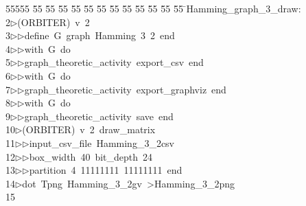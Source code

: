 %
%
\begin{tabbing}
55555 \= 55 \= 55 \= 55 \= 55 \= 55 \= 55 \= 55 \= 55 \= 55 \= 55 \= 55 \= 55 \= \>Hamming\_graph\_3\_draw:\\[0pt]
2\>$\triangleright$\>(ORBITER)\ v\ 2\ \\[0pt]
3\>$\triangleright$\>$\triangleright$\>define\ G\ graph\ Hamming\ 3\ 2\ end\ \\[0pt]
4\>$\triangleright$\>$\triangleright$\>with\ G\ do\ \\[0pt]
5\>$\triangleright$\>$\triangleright$\>graph\_theoretic\_activity\ export\_csv\ end\ \\[0pt]
6\>$\triangleright$\>$\triangleright$\>with\ G\ do\ \\[0pt]
7\>$\triangleright$\>$\triangleright$\>graph\_theoretic\_activity\ export\_graphviz\ end\ \\[0pt]
8\>$\triangleright$\>$\triangleright$\>with\ G\ do\ \\[0pt]
9\>$\triangleright$\>$\triangleright$\>graph\_theoretic\_activity\ save\ end\\[0pt]
10\>$\triangleright$\>(ORBITER)\ v\ 2\ draw\_matrix\ \\[0pt]
11\>$\triangleright$\>$\triangleright$\>input\_csv\_file\ Hamming\_3\_2csv\ \\[0pt]
12\>$\triangleright$\>$\triangleright$\>box\_width\ 40\ bit\_depth\ 24\ \\[0pt]
13\>$\triangleright$\>$\triangleright$\>partition\ 4\ 11111111\ 11111111\ end\\[0pt]
14\>$\triangleright$\>dot\ Tpng\ Hamming\_3\_2gv\ {\textgreater}Hamming\_3\_2png\\[0pt]
15\>\end{tabbing}

